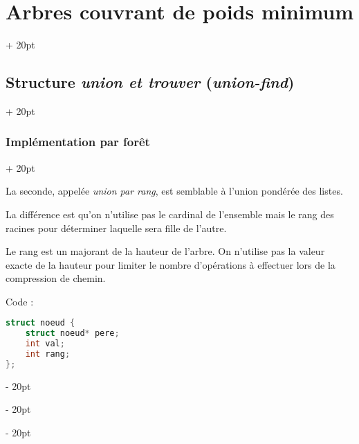 \documentclass[a4paper, 12pt, twoside]{article}
\newcommand{\ind}[1][20pt]{\advance\leftskip + #1}
\newcommand{\deind}[1][20pt]{\advance\leftskip - #1}
\newenvironment{indt}[2][20pt]{#2 \par \ind[#1]}{\par \deind} %
\begin{document}
\begin{indt}{\section{Arbres couvrant de poids minimum}}
\begin{indt}{\subsection{Structure \textit{union et trouver} (\textit{union-find})}}
\begin{indt}{\subsubsection{Implémentation par forêt}}
                \begin{center}
                \end{center}

                \begin{center}
                \end{center}

                La seconde, appelée \textit{union par rang}, est semblable à l'union pondérée des listes.

                La différence est qu'on n'utilise pas le cardinal de l'ensemble mais le rang des racines pour déterminer laquelle sera fille de l'autre.

                Le rang est un majorant de la hauteur de l'arbre.
                On n'utilise pas la valeur exacte de la hauteur pour limiter le nombre d'opérations à effectuer lors de la compression de chemin.

                Code :

                \begin{lstlisting}[language=C, xleftmargin=80pt]
struct noeud {
    struct noeud* pere;
    int val;
    int rang;
};


\end{lstlisting}
\end{indt}
\end{indt}
\end{indt}
\end{document}

